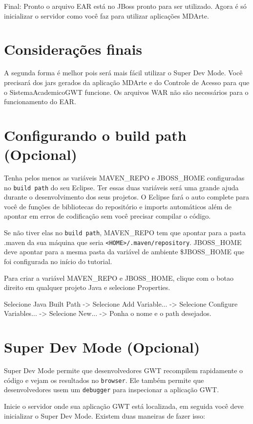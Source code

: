 Final: Pronto o arquivo EAR está no JBoss pronto para ser utilizado. Agora é só inicializar o servidor como você faz para utilizar
aplicações MDArte.

\section{Considerações finais}

A segunda forma é melhor pois será mais fácil utilizar o Super Dev Mode. Você precisará dos jars
gerados da aplicação MDArte e do Controle de Acesso para que o SistemaAcademicoGWT funcione. Os arquivos WAR não são necessários
para o funcionamento do EAR.

\section{Configurando o build path (Opcional)}

Tenha pelos menos as variáveis MAVEN\_REPO e JBOSS\_HOME configuradas no \texttt{build path} do seu Eclipse. Ter essas duas
variáveis será uma grande ajuda durante o desenvolvimento dos seus projetos. O Eclipse fará o auto complete para você de funções de bibliotecas
do repositório e imports automáticos além de apontar em erros de codificação sem você precisar compilar o código.

Se não tiver elas no \texttt{build path}, MAVEN\_REPO tem que apontar para a pasta .maven da sua máquina que seria
\texttt{<HOME>/.maven/repository}. JBOSS\_HOME deve apontar para a mesma pasta da variável de ambiente \$JBOSS\_HOME que foi
configurada no início do tutorial.

Para criar a variável MAVEN\_REPO e JBOSS\_HOME, clique com o botao direito em qualquer projeto Java e selecione Properties.

Selecione Java Built Path -> Selecione Add Variable... -> Selecione Configure Variables... -> Selecione New... -> Ponha o nome e o path desejados.

\section{Super Dev Mode (Opcional)}

Super Dev Mode permite que desenvolvedores GWT recompilem rapidamente o código e vejam os resultados no \texttt{browser}.
Ele também permite que desenvolvedores usem um \texttt{debugger} para inspecionar a aplicação GWT.

Inicie o servidor onde sua aplicação GWT está localizada, em seguida você deve inicializar o Super Dev Mode. Existem duas maneiras
de fazer isso:

